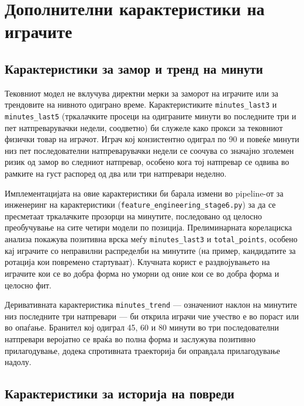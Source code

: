 
\section{Дополнителни карактеристики на играчите}

\subsection{Карактеристики за замор и тренд на минути}

Тековниот модел не вклучува директни мерки за заморот на играчите или за трендовите на нивното одиграно време. Карактеристиките \texttt{minutes\_last3} и \texttt{minutes\_last5} (тркалачките просеци на одиграните минути во последните три и пет натпреварувачки недели, соодветно) би служеле како прокси за тековниот физички товар на играчот. Играч кој конзистентно одиграл по 90 и повеќе минути низ пет последователни натпреварувачки недели се соочува со значајно зголемен ризик од замор во следниот натпревар, особено кога тој натпревар се одвива во рамките на густ распоред од два или три натпревари неделно.

Имплементацијата на овие карактеристики би барала измени во pipeline-от за инженеринг на карактеристики (\texttt{feature\_engineering\_stage6.py}) за да се пресметаат тркалачките прозорци на минутите, последовано од целосно преобучување на сите четири модели по позиција. Прелиминарната корелациска анализа покажува позитивна врска меѓу \texttt{minutes\_last3} и \texttt{total\_points}, особено кај играчите со неправилни распределби на минутите (на пример, кандидатите за ротација кои повремено стартуваат). Клучната корист е раздвојувањето на играчите кои се во добра форма но уморни од оние кои се во добра форма и целосно фит.

Деривативната карактеристика \texttt{minutes\_trend} — означениот наклон на минутите низ последните три натпревари — би открила играчи чие учество е во пораст или во опаѓање. Бранител кој одиграл 45, 60 и 80 минути во три последователни натпревари веројатно се враќа во полна форма и заслужува позитивно прилагодување, додека спротивната траекторија би оправдала прилагодување надолу.

\subsection{Карактеристики за историја на повреди}

